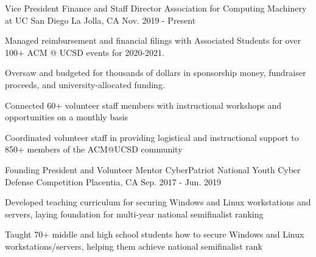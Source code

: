 

\begin{cventries}

  \cventry
    {Vice President Finance and Staff Director} %
    {Association for Computing Machinery at UC San Diego} %
    {La Jolla, CA} %
    {Nov. 2019 - Present} %
    {
      \begin{cvitems} %
        \item {Managed reimbursement and financial filings with Associated Students for over 100+ ACM @ UCSD events for 2020-2021.}
        \item {Oversaw and budgeted for thousands of dollars in sponsorship money, fundraiser proceeds, and university-allocated funding.}
        \item {Connected 60+ volunteer staff members with instructional workshops and opportunities on a monthly basis}
        \item {Coordinated volunteer staff in providing logistical and instructional support to 850+ members of the ACM@UCSD community}
      \end{cvitems}
    }

  \cventry
    {Founding President and Volunteer Mentor} %
    {CyberPatriot National Youth Cyber Defense Competition} %
    {Placentia, CA} %
    {Sep. 2017 - Jun. 2019} %
    {
      \begin{cvitems} %
        \item {Developed teaching curriculum for securing Windows and Linux workstations and servers, laying foundation for multi-year national semifinalist ranking}
        \item {Taught 70+ middle and high school students how to secure Windows and Linux workstations/servers, helping them achieve national semifinalist rank}
      \end{cvitems}
    }


\end{cventries}
